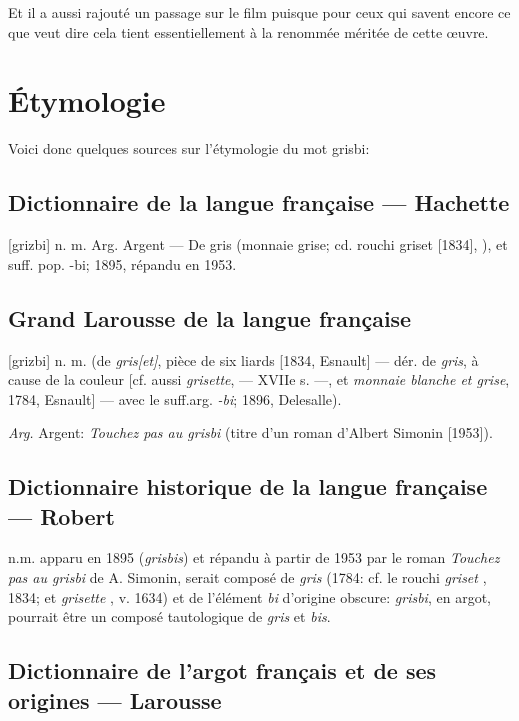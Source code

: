 Et il a aussi rajouté un passage sur le film puisque pour ceux qui savent encore ce que  veut dire cela tient essentiellement à la renommée méritée de cette \oe uvre.


\section{Étymologie\label{preamble-etymology}}


Voici donc quelques sources sur l'étymologie du mot grisbi:


\subsection*{Dictionnaire de la langue française --- Hachette}

[grizbi] n. m. Arg. Argent --- De gris (monnaie grise; cd. rouchi griset [1834], ), et suff. pop. -bi; 1895, répandu en 1953.


\subsection*{Grand Larousse de la langue française}

[grizbi] n. m. (de \emph{gris[et]}, pièce de six liards [1834, Esnault] --- dér. de \emph{gris}, à cause de la couleur [cf. aussi \emph{grisette},  --- XVIIe s. ---, et \emph{monnaie blanche et grise}, 1784, Esnault] --- avec le suff.arg. \emph{-bi}; 1896, Delesalle).

\emph{Arg.} Argent: \emph{Touchez pas au grisbi} (titre d'un roman d'Albert Simonin [1953]).


\subsection*{Dictionnaire historique de la langue française --- Robert}

n.m. apparu en 1895 (\emph{grisbis}) et répandu à partir de 1953 par le roman \emph{Touchez pas au grisbi} de A. Simonin, serait composé de \emph{gris}  (1784: cf. le rouchi \emph{griset} , 1834; et \emph{grisette} , v. 1634) et de l'élément \emph{bi} d'origine obscure: \emph{grisbi},  en argot, pourrait être un composé tautologique de \emph{gris} et \emph{bis}.


\subsection*{Dictionnaire de l'argot français et de ses origines --- Larousse}


